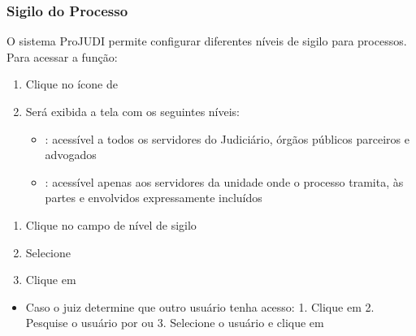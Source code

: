 \documentclass[letterpaper,10pt,brazil]{sphinxmanual}
\begin{document}
\subsubsection{Sigilo do Processo}
\label{\detokenize{projud_13_alterarsigilo:sigilo-do-processo}}
\sphinxAtStartPar
O sistema ProJUDI permite configurar diferentes níveis de sigilo para processos. Para acessar a função:
\begin{enumerate}
%
\item {} 
\sphinxAtStartPar
Clique no ícone de 

\item {} 
\sphinxAtStartPar
Será exibida a tela com os seguintes níveis:
\begin{itemize}
\item {} 
\sphinxAtStartPar
{}: acessível a todos os servidores do Judiciário, órgãos públicos parceiros e advogados

\item {} 
\sphinxAtStartPar
{}: acessível apenas aos servidores da unidade onde o processo tramita, às partes e envolvidos expressamente incluídos

\end{itemize}

\end{enumerate}

\sphinxAtStartPar
{}
\begin{enumerate}
%
\item {} 
\sphinxAtStartPar
Clique no campo de nível de sigilo

\item {} 
\sphinxAtStartPar
Selecione 

\item {} 
\sphinxAtStartPar
Clique em 

\end{enumerate}

\sphinxAtStartPar
{}
\begin{itemize}
\item {} 
\sphinxAtStartPar
Caso o juiz determine que outro usuário tenha acesso:
1. Clique em 
2. Pesquise o usuário por  ou 
3. Selecione o usuário e clique em 

\end{itemize}
\end{document}
